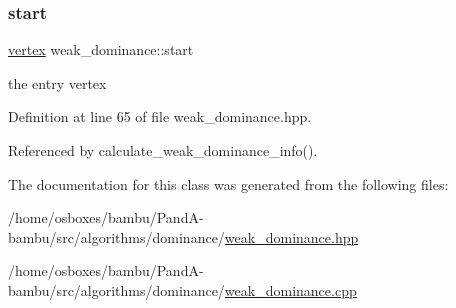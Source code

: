 \subsubsection{\texorpdfstring{start}{start}}
{\footnotesize\ttfamily \hyperlink{graph_8hpp_abefdcf0544e601805af44eca032cca14}{vertex} weak\+\_\+dominance\+::start\hspace{0.3cm}{\ttfamily [private]}}



the entry vertex 



Definition at line 65 of file weak\+\_\+dominance.\+hpp.



Referenced by calculate\+\_\+weak\+\_\+dominance\+\_\+info().



The documentation for this class was generated from the following files\+:\begin{DoxyCompactItemize}
\item 
/home/osboxes/bambu/\+Pand\+A-\/bambu/src/algorithms/dominance/\hyperlink{weak__dominance_8hpp}{weak\+\_\+dominance.\+hpp}\item 
/home/osboxes/bambu/\+Pand\+A-\/bambu/src/algorithms/dominance/\hyperlink{weak__dominance_8cpp}{weak\+\_\+dominance.\+cpp}\end{DoxyCompactItemize}
